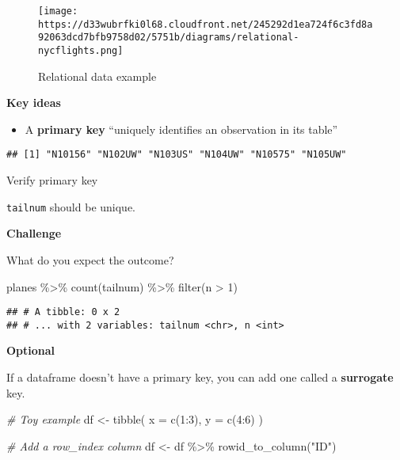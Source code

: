 \documentclass[
]{book}
\newenvironment{Shaded}{\begin{snugshade}}{\end{snugshade}}
\newcommand{\AttributeTok}[1]{\textcolor[rgb]{0.77,0.63,0.00}{#1}}
\newcommand{\CommentTok}[1]{\textcolor[rgb]{0.56,0.35,0.01}{\textit{#1}}}
\newcommand{\DecValTok}[1]{\textcolor[rgb]{0.00,0.00,0.81}{#1}}
\newcommand{\FunctionTok}[1]{\textcolor[rgb]{0.00,0.00,0.00}{#1}}
\newcommand{\NormalTok}[1]{#1}
\newcommand{\OtherTok}[1]{\textcolor[rgb]{0.56,0.35,0.01}{#1}}
\newcommand{\SpecialCharTok}[1]{\textcolor[rgb]{0.00,0.00,0.00}{#1}}
\newcommand{\StringTok}[1]{\textcolor[rgb]{0.31,0.60,0.02}{#1}}
\providecommand{\tightlist}{%
  \setlength{\itemsep}{0pt}\setlength{\parskip}{0pt}}
\begin{document}
\begin{figure}
\centering
\texttt{[image: https://d33wubrfki0l68.cloudfront.net/245292d1ea724f6c3fd8a92063dcd7bfb9758d02/5751b/diagrams/relational-nycflights.png]}
\caption{Relational data example}
\end{figure}

\textbf{Key ideas}

\begin{itemize}
\tightlist
\item
  A \textbf{primary key} ``uniquely identifies an observation in its table''
\end{itemize}

\begin{Shaded}
\end{Shaded}

\begin{verbatim}
## [1] "N10156" "N102UW" "N103US" "N104UW" "N10575" "N105UW"
\end{verbatim}

Verify primary key

\texttt{tailnum} should be unique.

\textbf{Challenge}

What do you expect the outcome?

\begin{Shaded}
\begin{Highlighting}[]
\NormalTok{planes }\SpecialCharTok{\%\textgreater{}\%}
  \FunctionTok{count}\NormalTok{(tailnum) }\SpecialCharTok{\%\textgreater{}\%}
  \FunctionTok{filter}\NormalTok{(n }\SpecialCharTok{\textgreater{}} \DecValTok{1}\NormalTok{)}
\end{Highlighting}
\end{Shaded}

\begin{verbatim}
## # A tibble: 0 x 2
## # ... with 2 variables: tailnum <chr>, n <int>
\end{verbatim}

\textbf{Optional}

If a dataframe doesn't have a primary key, you can add one called a \textbf{surrogate} key.

\begin{Shaded}
\begin{Highlighting}[]
\CommentTok{\# Toy example}
\NormalTok{df }\OtherTok{\textless{}{-}} \FunctionTok{tibble}\NormalTok{(}
  \AttributeTok{x =} \FunctionTok{c}\NormalTok{(}\DecValTok{1}\SpecialCharTok{:}\DecValTok{3}\NormalTok{),}
  \AttributeTok{y =} \FunctionTok{c}\NormalTok{(}\DecValTok{4}\SpecialCharTok{:}\DecValTok{6}\NormalTok{)}
\NormalTok{)}

\CommentTok{\# Add a row\_index column}
\NormalTok{df }\OtherTok{\textless{}{-}}\NormalTok{ df }\SpecialCharTok{\%\textgreater{}\%} \FunctionTok{rowid\_to\_column}\NormalTok{(}\StringTok{"ID"}\NormalTok{)}
\end{Highlighting}
\end{Shaded}
\end{document}
